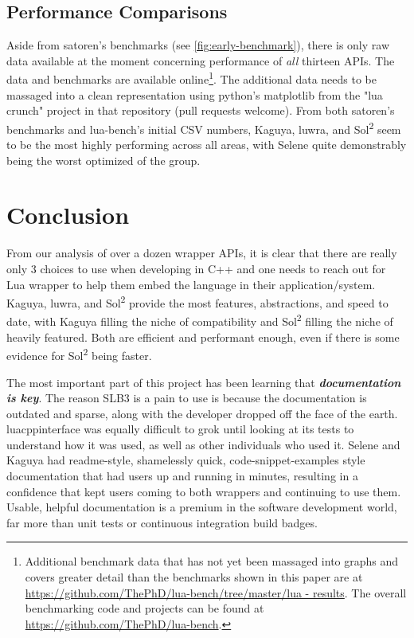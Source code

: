 \documentclass[conference,compsoc]{IEEEtran}
\newcommand{\soltwo}{Sol\textsuperscript{2}}
\begin{document}
\subsection{Performance Comparisons}

Aside from satoren's benchmarks (see \cref{fig:early-benchmark}), there is only raw data available at the moment concerning performance of \emph{all} thirteen APIs. The data and benchmarks are available online\footnote{Additional benchmark data that has not yet been massaged into graphs and covers greater detail than the benchmarks shown in this paper are at \url{https://github.com/ThePhD/lua-bench/tree/master/lua - results}. The overall benchmarking code and projects can be found at \url{https://github.com/ThePhD/lua-bench}.}. The additional data needs to be massaged into a clean representation using python's matplotlib from the "lua crunch" project in that repository (pull requests welcome). From both satoren's benchmarks and lua-bench's initial CSV numbers, Kaguya, luwra, and \soltwo{} seem to be the most highly performing across all areas, with Selene quite demonstrably being the worst optimized of the group.


\section{Conclusion}

From our analysis of over a dozen wrapper APIs, it is clear that there are really only 3 choices to use when developing in C++ and one needs to reach out for Lua wrapper to help them embed the language in their application/system. Kaguya, luwra, and \soltwo{} provide the most features, abstractions, and speed to date, with Kaguya filling the niche of compatibility and \soltwo{} filling the niche of heavily featured. Both are efficient and performant enough, even if there is some evidence for \soltwo{} being faster.

The most important part of this project has been learning that \emph{\textbf{documentation is key}}. The reason SLB3 is a pain to use is because the documentation is outdated and sparse, along with the developer dropped off the face of the earth. luacppinterface was equally difficult to grok until looking at its tests to understand how it was used, as well as other individuals who used it. Selene and Kaguya had readme-style, shamelessly quick, code-snippet-examples style documentation that had users up and running in minutes, resulting in a confidence that kept users coming to both wrappers and continuing to use them. Usable, helpful documentation is a premium in the software development world, far more than unit tests or continuous integration build badges.
\end{document}
